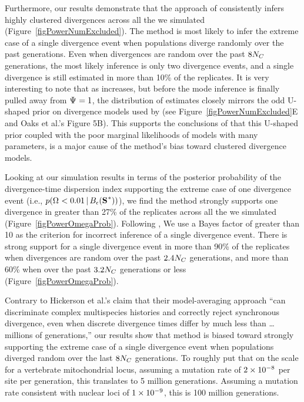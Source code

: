 \documentclass[letterpaper,12pt]{article}
\begin{document}
\begin{linenumbers}
Furthermore, our results demonstrate that the approach of \citet{Hickerson2013}
consistently infers highly clustered divergences across all the  we
simulated (Figure~\ref{figPowerNumExcluded}).
The method is most likely to infer the extreme case of a single divergence event
when populations diverge randomly over the past \globalcoalunit generations.
Even when divergences are random over the past $8N_C$ generations,
the most likely inference is only two divergence events, and a single 
divergence is still estimated in more than 10\% of the replicates.
It is very interesting to note that as  increases, but before the
mode inference is finally pulled away from $\Psi_{} = 1$, the distribution of
\numt{} estimates closely mirrors the odd U-shaped prior on divergence models
used by \msb (see Figure~\ref{figPowerNumExcluded}E and Oaks et al.'s
\citeyear{Oaks2012} Figure 5B).
This supports the conclusions of \citet{Oaks2012} that this U-shaped
prior coupled with the poor marginal likelihoods of models with many
\divt{} parameters, is a major cause of the method's bias toward
clustered divergence models.

Looking at our simulation results in terms of the posterior probability of the
divergence-time dispersion index supporting the extreme case of one divergence
event (i.e., $p(\vmratio{} < 0.01 \given \ssSpace)$), we find the method
strongly supports one divergence in greater than 27\%
of the replicates across all the  we simulated
(Figure~\ref{figPowerOmegaProb}).
Following \citet{Hickerson2013}, We use a Bayes factor of greater than 10 as
the criterion for incorrect inference of a single divergence event.
There is strong support for a single divergence event in more than 90\% of the
replicates when divergences are random over the past $2.4N_C$
generations, and more than 60\% when over the past $3.2N_C$
generations or less (Figure~\ref{figPowerOmegaProb}).

Contrary to Hickerson et al.'s \citeyear{Hickerson2013} claim that their
model-averaging approach ``can discriminate complex multispecies histories and
correctly reject synchronous divergence, even when discrete divergence times
differ by much less than \ldots millions of generations,'' our results show
that method is biased toward strongly supporting the extreme case of a single
divergence event when populations diverged random over the last
$8N_C$ generations.
To roughly put that on the scale for a vertebrate mitochondrial locus, assuming
a mutation rate of $2\times 10^{-8}$ per site per generation, this translates to 5
million generations.
Assuming a mutation rate consistent with nuclear loci of $1\times 10^{-9}$, this is 100
million generations.


\end{linenumbers}
\end{document}
